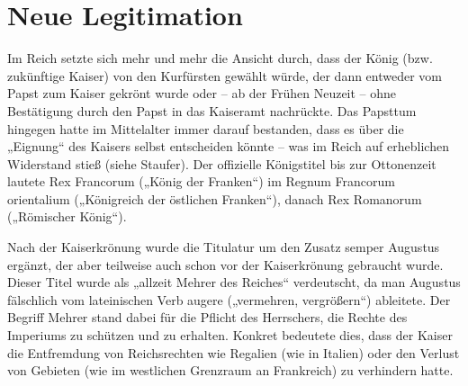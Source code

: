 \section{Neue Legitimation}

Im Reich setzte sich mehr und mehr die Ansicht durch, dass der König (bzw. zukünftige Kaiser) von den Kurfürsten gewählt würde, der dann entweder vom Papst zum Kaiser gekrönt wurde oder – ab der Frühen Neuzeit – ohne Bestätigung durch den Papst in das Kaiseramt nachrückte. Das Papsttum hingegen hatte im Mittelalter immer darauf bestanden, dass es über die „Eignung“ des Kaisers selbst entscheiden könnte – was im Reich auf erheblichen Widerstand stieß (siehe Staufer). Der offizielle Königstitel bis zur Ottonenzeit lautete Rex Francorum („König der Franken“) im Regnum Francorum orientalium („Königreich der östlichen Franken“), danach Rex Romanorum („Römischer König“).

Nach der Kaiserkrönung wurde die Titulatur um den Zusatz semper Augustus ergänzt, der aber teilweise auch schon vor der Kaiserkrönung gebraucht wurde. Dieser Titel wurde als „allzeit Mehrer des Reiches“ verdeutscht, da man Augustus fälschlich vom lateinischen Verb augere („vermehren, vergrößern“) ableitete. Der Begriff Mehrer stand dabei für die Pflicht des Herrschers, die Rechte des Imperiums zu schützen und zu erhalten. Konkret bedeutete dies, dass der Kaiser die Entfremdung von Reichsrechten wie Regalien (wie in Italien) oder den Verlust von Gebieten (wie im westlichen Grenzraum an Frankreich) zu verhindern hatte.
\cite{Kintzinger}

